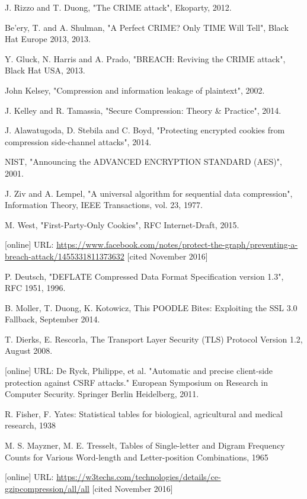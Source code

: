 \documentclass[conference, letterpaper, 10pt]{IEEEtran}
\begin{document}
\begin{thebibliography}{13}

 J. Rizzo and T. Duong, "The CRIME attack", Ekoparty, 2012.

 Be'ery, T. and A. Shulman, "A Perfect CRIME? Only TIME Will Tell",
Black Hat Europe 2013, 2013.

 Y. Gluck, N. Harris and A. Prado, "BREACH: Reviving the CRIME attack",
Black Hat USA, 2013.

 John Kelsey, "Compression and information leakage of plaintext", 2002.

 J. Kelley and R. Tamassia, "Secure Compression: Theory \& Practice",
2014.

 J. Alawatugoda, D. Stebila and C. Boyd, "Protecting encrypted
cookies from compression side-channel attacks", 2014.


 NIST, "Announcing the ADVANCED ENCRYPTION STANDARD (AES)", 2001.

 J. Ziv and A. Lempel, "A universal algorithm for sequential data
compression", Information Theory, IEEE Transactions, vol. 23, 1977.

 M. West, "First-Party-Only Cookies", RFC Internet-Draft, 2015.

 [online] URL:
\url{https://www.facebook.com/notes/protect-the-graph/preventing-a-breach-attack/1455331811373632}
[cited November 2016]

 P. Deutsch, "DEFLATE Compressed Data Format Specification version
1.3", RFC 1951, 1996.


 B. Moller, T. Duong, K. Kotowicz, This POODLE Bites: Exploiting the SSL 3.0 Fallback, September 2014.

 T. Dierks, E. Rescorla, The Transport Layer Security (TLS)
Protocol Version 1.2, August 2008.

 [online] URL:
De Ryck, Philippe, et al. "Automatic and precise client-side protection against
CSRF attacks." European Symposium on Research in Computer Security. Springer
Berlin Heidelberg, 2011.

 R. Fisher, F. Yates: Statistical tables for biological,
agricultural and medical research, 1938

 M. S. Mayzner, M. E. Tresselt, Tables of Single-letter and Digram
Frequency Counts for Various Word-length and Letter-position Combinations, 1965

 [online] URL:
\url{https://w3techs.com/technologies/details/ce-gzipcompression/all/all} [cited
November 2016]


\end{thebibliography}
\end{document}
